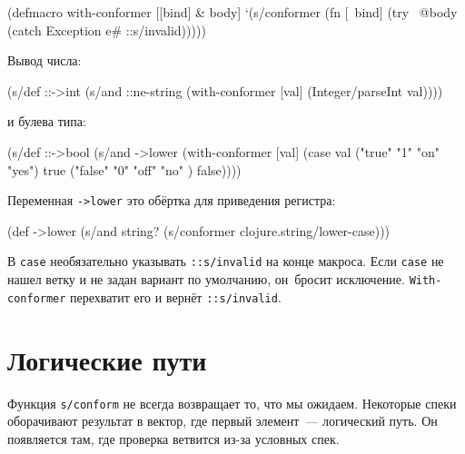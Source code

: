 \begin{english}
  \begin{clojure}
(defmacro with-conformer
  [[bind] & body]
  `(s/conformer
    (fn [~bind]
      (try
        ~@body
        (catch Exception e#
          ::s/invalid)))))
  \end{clojure}
\end{english}

\noindent
Вывод числа:

\begin{english}
  \begin{clojure}
(s/def ::->int
  (s/and
   ::ne-string
   (with-conformer [val]
     (Integer/parseInt val))))
  \end{clojure}
\end{english}

\noindent
и булева типа:

\begin{english}
  \begin{clojure}
(s/def ::->bool
  (s/and
   ->lower
   (with-conformer [val]
     (case val
       ("true"  "1" "on"  "yes") true
       ("false" "0" "off" "no" ) false))))
  \end{clojure}
\end{english}


\noindent
Переменная \verb|->lower| это обёртка для приведения регистра:

\begin{english}
  \begin{clojure}
(def ->lower
  (s/and
    string?
    (s/conformer clojure.string/lower-case)))
  \end{clojure}
\end{english}

В \verb|case| необязательно указывать \verb|::s/invalid| на конце
макроса. Если \verb|case| не нашел ветку и не задан вариант по умолчанию,
он~бросит исключение. \verb|With-conformer| перехватит его и вернёт
\verb|::s/invalid|.

\section{Логические пути}


Функция \verb|s/conform| не всегда возвращает то, что мы ожидаем. Некоторые
спеки оборачивают результат в вектор, где первый элемент~--- логический путь. Он
появляется там, где проверка ветвится из-за условных спек.

